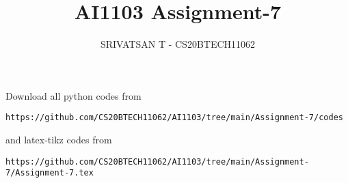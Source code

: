 \documentclass[journal,12pt,twocolumn]{IEEEtran}
\DeclareMathOperator*{\Res}{Res}
\begin{document}
\newcommand{\BEQA}{\begin{eqnarray}}
        \newcommand{\EEQA}{\end{eqnarray}}
\newcommand{\define}{\stackrel{\triangle}{=}}

\raggedbottom
\setlength{\parindent}{0pt}
\providecommand{\mbf}{\mathbf}
\providecommand{\pr}[1]{\ensuremath{\Pr\left(#1\right)}}
\providecommand{\qfunc}[1]{\ensuremath{Q\left(#1\right)}}
\providecommand{\sbrak}[1]{\ensuremath{{}\left[#1\right]}}
\providecommand{\lsbrak}[1]{\ensuremath{{}\left[#1\right.}}
\providecommand{\rsbrak}[1]{\ensuremath{{}\left.#1\right]}}
\providecommand{\brak}[1]{\ensuremath{\left(#1\right)}}
\providecommand{\lbrak}[1]{\ensuremath{\left(#1\right.}}
\providecommand{\rbrak}[1]{\ensuremath{\left.#1\right)}}
\providecommand{\cbrak}[1]{\ensuremath{\left\{#1\right\}}}
\providecommand{\lcbrak}[1]{\ensuremath{\left\{#1\right.}}
\providecommand{\rcbrak}[1]{\ensuremath{\left.#1\right\}}}
\theoremstyle{remark}
\newtheorem{rem}{Remark}
\newcommand{\sgn}{\mathop{\mathrm{sgn}}}
\providecommand{\abs}[1]{\big\vert#1\big\vert}
\providecommand{\res}[1]{\Res\displaylimits_{#1}}
\providecommand{\norm}[1]{\lVert#1\rVert}
\providecommand{\mtx}[1]{\mathbf{#1}}
\providecommand{\mean}[1]{E[#1]}
\providecommand{\fourier}{\overset{\mathcal{F}}{ \rightleftharpoons}}
\providecommand{\system}{\overset{\mathcal{H}}{ \longleftrightarrow}}
\newcommand{\solution}{\noindent \textbf{Solution: }}
\newcommand{\cosec}{\,\text{cosec}\,}
\newcommand{\comb}[2]{{}^{#1}\mathrm{C}_{#2}}
\providecommand{\dec}[2]{\ensuremath{\overset{#1}{\underset{#2}{\gtrless}}}}
\newcommand{\myvec}[1]{\ensuremath{\begin{pmatrix}#1\end{pmatrix}}}
\newcommand{\mydet}[1]{\ensuremath{\begin{vmatrix}#1\end{vmatrix}}}
\makeatletter
{}
\makeatother
\let\StandardTheFigure\thefigure
\let\vec\mathbf
\renewcommand{\thefigure}{\theproblem}
\def\putbox#1#2#3{\makebox[0in][l]{\makebox[#1][l]{}\raisebox{\baselineskip}[0in][0in]{\raisebox{#2}[0in][0in]{#3}}}}
\def\rightbox#1{\makebox[0in][r]{#1}}
\def\centbox#1{\makebox[0in]{#1}}
\def\topbox#1{\raisebox{-\baselineskip}[0in][0in]{#1}}
\def\midbox#1{\raisebox{-0.5\baselineskip}[0in][0in]{#1}}
\vspace{3cm}
\title{AI1103 Assignment-7}
\author{SRIVATSAN T - CS20BTECH11062}
\maketitle
\newpage
\bigskip
\renewcommand{\thefigure}{\theenumi}
\renewcommand{\thetable}{\theenumi}
Download all python codes from
\begin{lstlisting}
https://github.com/CS20BTECH11062/AI1103/tree/main/Assignment-7/codes
\end{lstlisting}
%
and latex-tikz codes from
%
\begin{lstlisting}
https://github.com/CS20BTECH11062/AI1103/tree/main/Assignment-7/Assignment-7.tex
\end{lstlisting}
\end{document}
